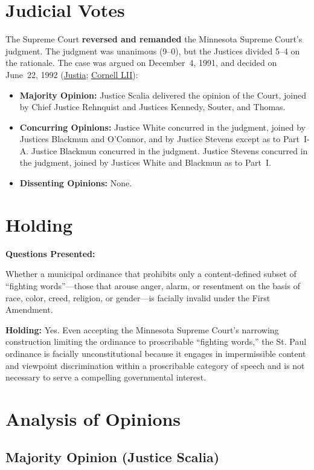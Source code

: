 \documentclass[12pt]{article}
\begin{document}
\section{Judicial Votes}
The Supreme Court \textbf{reversed and remanded} the Minnesota Supreme Court's judgment. The judgment was unanimous (9--0), but the Justices divided 5--4 on the rationale. The case was argued on December~4, 1991, and decided on June~22, 1992 (\href{https://supreme.justia.com/cases/federal/us/505/377/}{Justia}; \href{https://www.law.cornell.edu/supremecourt/text/90-7675}{Cornell LII}):

\begin{itemize}
    \item \textbf{Majority Opinion:} Justice Scalia delivered the opinion of the Court, joined by Chief Justice Rehnquist and Justices Kennedy, Souter, and Thomas.
    \item \textbf{Concurring Opinions:} Justice White concurred in the judgment, joined by Justices Blackmun and O'Connor, and by Justice Stevens except as to Part~I-A. Justice Blackmun concurred in the judgment. Justice Stevens concurred in the judgment, joined by Justices White and Blackmun as to Part~I.
    \item \textbf{Dissenting Opinions:} None.
\end{itemize}

\section{Holding}
\textbf{Questions Presented:}

Whether a municipal ordinance that prohibits only a content-defined subset of ``fighting words''---those that arouse anger, alarm, or resentment on the basis of race, color, creed, religion, or gender---is facially invalid under the First Amendment.

\textbf{Holding:} Yes. Even accepting the Minnesota Supreme Court's narrowing construction limiting the ordinance to proscribable ``fighting words,'' the St. Paul ordinance is facially unconstitutional because it engages in impermissible content and viewpoint discrimination within a proscribable category of speech and is not necessary to serve a compelling governmental interest.

\section{Analysis of Opinions}
\subsection{Majority Opinion (Justice Scalia)}
\end{document}
